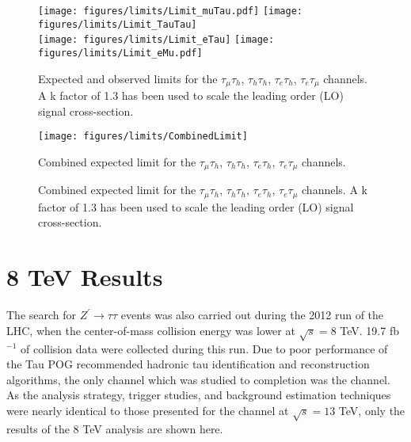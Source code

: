 
\begin{figure}[tbh!]
  \centering
  \texttt{[image: figures/limits/Limit\_muTau.pdf]}
  \texttt{[image: figures/limits/Limit\_TauTau]}\\
  \texttt{[image: figures/limits/Limit\_eTau]}
  \texttt{[image: figures/limits/Limit\_eMu.pdf]}
  \caption{Expected and observed limits for the $\tau_{\mu}\tau_{h}$, $\tau_{h}\tau_{h}$, $\tau_{e}\tau_{h}$, $\tau_{e}\tau_{\mu}$ channels. A k factor of 1.3 has been used to scale the leading order (LO) signal cross-section.} 
    \label{fig:Limits}
\end{figure}

\begin{figure}[tbh!]
  \centering
  \texttt{[image: figures/limits/CombinedLimit]}  \caption{Combined expected limit for the $\tau_{\mu}\tau_{h}$, $\tau_{h}\tau_{h}$, $\tau_{e}\tau_{h}$, $\tau_{e}\tau_{\mu}$ channels.}
  \caption{Combined expected limit for the $\tau_{\mu}\tau_{h}$, $\tau_{h}\tau_{h}$, $\tau_{e}\tau_{h}$, $\tau_{e}\tau_{\mu}$ channels. A k factor of 1.3 has been used to scale the leading order (LO) signal cross-section.}
  \label{fig:CombinedLimits}
\end{figure}



\section{8 TeV Results}

The search for $Z^{\prime}\to\tau\tau$ events was also carried out during the 2012 run of the LHC, when the center-of-mass collision energy was lower at $\sqrt{s} = 8$ TeV. 19.7 fb$^{-1}$ of collision data were collected during this run. Due to poor performance of the Tau POG recommended hadronic tau identification and reconstruction algorithms, the only channel which was studied to completion was the \emu channel. As the analysis strategy, trigger studies, and background estimation techniques were nearly identical to those presented for the \emu channel at $\sqrt{s} = 13$ TeV, only the results of the 8 TeV \emu analysis are shown here.


